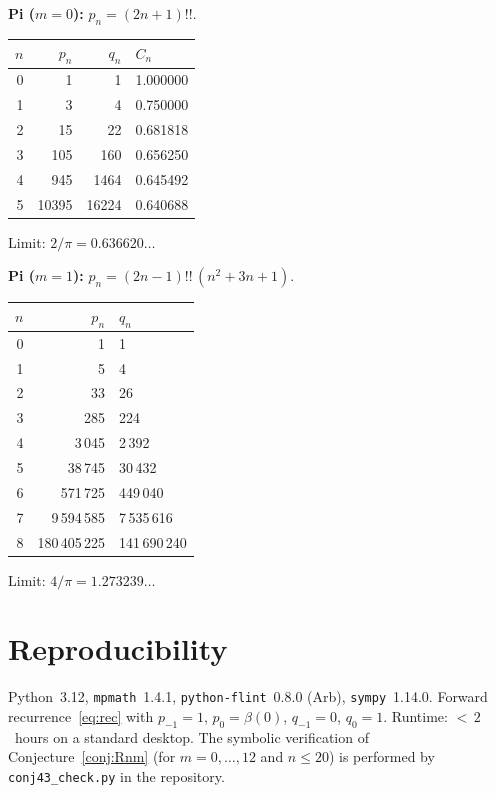 \documentclass[11pt,a4paper]{article}
\theoremstyle{plain}
\theoremstyle{definition}
\theoremstyle{remark}
\newcommand{\dff}[1]{(#1)!!}
\begin{document}
\medskip
\textbf{Pi ($m{=}0$):} $p_n = (2n{+}1)!!$.

\smallskip
\begin{center}
\begin{tabular}{@{}rrrl@{}}
\toprule
$n$ & $p_n$ & $q_n$ & $C_n$ \\
\midrule
0 & 1 & 1 & 1.000000 \\
1 & 3 & 4 & 0.750000 \\
2 & 15 & 22 & 0.681818 \\
3 & 105 & 160 & 0.656250 \\
4 & 945 & 1464 & 0.645492 \\
5 & 10395 & 16224 & 0.640688 \\
\bottomrule
\end{tabular}
\end{center}
\smallskip\noindent Limit: $2/\pi = 0.636620\ldots$

\medskip
\textbf{Pi ($m{=}1$):}
$p_n = \dff{2n{-}1}\,(n^2{+}3n{+}1)$.

\smallskip
\begin{center}
\begin{tabular}{@{}rrl@{}}
\toprule
$n$ & $p_n$ & $q_n$ \\
\midrule
0 & 1 & 1 \\
1 & 5 & 4 \\
2 & 33 & 26 \\
3 & 285 & 224 \\
4 & 3\,045 & 2\,392 \\
5 & 38\,745 & 30\,432 \\
6 & 571\,725 & 449\,040 \\
7 & 9\,594\,585 & 7\,535\,616 \\
8 & 180\,405\,225 & 141\,690\,240 \\
\bottomrule
\end{tabular}
\end{center}
\smallskip\noindent Limit: $4/\pi = 1.273239\ldots$

\section{Reproducibility}\label{app:repro}

Python~3.12, \texttt{mpmath}~1.4.1,
\texttt{python-flint}~0.8.0 (Arb),
\texttt{sympy}~1.14.0.
Forward recurrence~\eqref{eq:rec} with
$p_{-1}{=}1$, $p_0{=}\beta(0)$, $q_{-1}{=}0$, $q_0{=}1$.
Runtime: ${<}\,2$~hours on a standard desktop.
The symbolic verification of Conjecture~\ref{conj:Rnm}
(for $m=0,\ldots,12$ and $n\le 20$) is performed by
\texttt{conj43\_check.py} in the repository.
\end{document}
